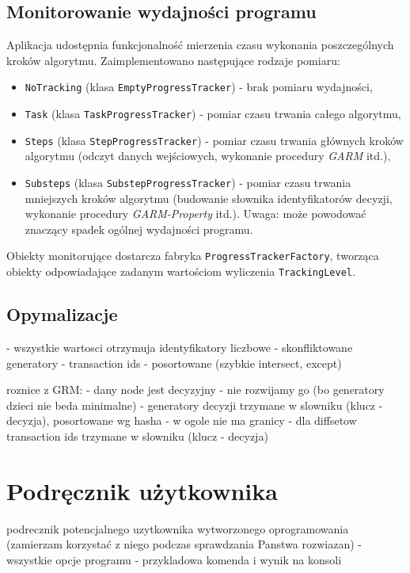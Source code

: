 \documentclass[a4paper,10pt]{article}
\begin{document}
 
 \subsection{Monitorowanie wydajności programu} \label{sec:impl:track}
 Aplikacja udostępnia funkcjonalność mierzenia czasu wykonania poszczególnych kroków algorytmu.
 Zaimplementowano następujące rodzaje pomiaru:
 
 \begin{itemize}
  \item \verb+NoTracking+ (klasa \verb+EmptyProgressTracker+) - brak pomiaru wydajności,
  \item \verb+Task+ (klasa \verb+TaskProgressTracker+) - pomiar czasu trwania całego algorytmu,
  \item \verb+Steps+ (klasa \verb+StepProgressTracker+) - pomiar czasu trwania głównych kroków algorytmu (odczyt danych wejściowych, wykonanie procedury \emph{GARM} itd.),
  \item \verb+Substeps+ (klasa \verb+SubstepProgressTracker+) - pomiar czasu trwania mniejszych kroków algorytmu (budowanie słownika identyfikatorów decyzji, wykonanie procedury \emph{GARM-Property} itd.). Uwaga: może powodować znaczący spadek ogólnej wydajności programu.
 \end{itemize}

 Obiekty monitorujące dostarcza fabryka \verb+ProgressTrackerFactory+, tworząca obiekty odpowiadające zadanym wartościom wyliczenia \verb+TrackingLevel+.

 \subsection{Opymalizacje}
 - wszystkie wartosci otrzymuja identyfikatory liczbowe
 - skonfliktowane generatory
 - transaction ids - posortowane (szybkie intersect, except)

 roznice z GRM:
 - dany node jest decyzyjny - nie rozwijamy go (bo generatory dzieci nie beda minimalne)
 - generatory decyzji trzymane w slowniku (klucz - decyzja), posortowane wg hasha
 - w ogole nie ma granicy
 - dla diffsetow transaction ids trzymane w slowniku (klucz - decyzja)



\section{Podręcznik użytkownika}
podrecznik potencjalnego uzytkownika wytworzonego oprogramowania
(zamierzam korzystać z niego podczas sprawdzania Panstwa rozwiazan)
- wszystkie opcje programu
- przykladowa komenda i wynik na konsoli
\end{document}
